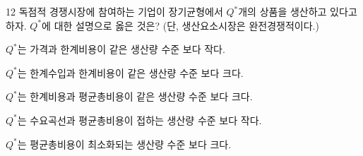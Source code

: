 \begin{question}{12}
독점적 경쟁시장에 참여하는 기업이 장기균형에서 $Q^{ * }$개의 상품을 생산하고 있다고 하자. $Q^{ * }$에 대한 설명으로 옳은 것은? (단, 생산요소시장은 완전경쟁적이다.)
\begin{choices}
  \item $Q^{ * }$는 가격과 한계비용이 같은 생산량 수준 보다 작다.
  \item $Q^{ * }$는 한계수입과 한계비용이 같은 생산량 수준 보다 크다.
  \item $Q^{ * }$는 한계비용과 평균총비용이 같은 생산량 수준 보다 크다.
  \item $Q^{ * }$는 수요곡선과 평균총비용이 접하는 생산량 수준 보다 작다.
  \item $Q^{ * }$는 평균총비용이 최소화되는 생산량 수준 보다 크다.
\end{choices}
\end{question}
